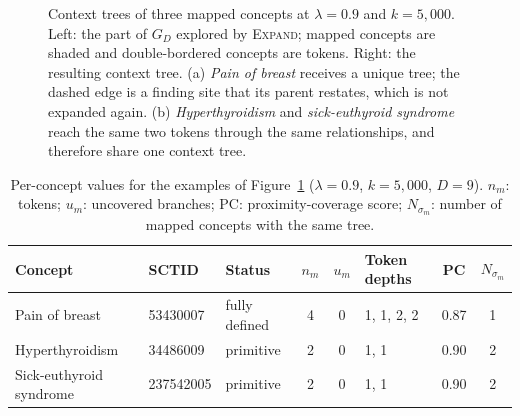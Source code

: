 \begin{figure}[t]
\caption{Context trees of three mapped concepts at $\lambda = 0.9$ and $k = 5{,}000$. Left: the part of $G_D$ explored by \textsc{Expand}; mapped concepts are shaded and double-bordered concepts are tokens. Right: the resulting context tree. (a) \textit{Pain of breast} receives a unique tree; the dashed edge is a finding site that its parent restates, which is not expanded again. (b) \textit{Hyperthyroidism} and \textit{sick-euthyroid syndrome} reach the same two tokens through the same relationships, and therefore share one context tree.}
\label{fig:example-trees}
\end{figure}

\begin{table}[t]
\centering
\small
\caption{Per-concept values for the examples of Figure~\ref{fig:example-trees} ($\lambda = 0.9$, $k = 5{,}000$, $D = 9$). $n_m$: tokens; $u_m$: uncovered branches; PC: proximity-coverage score; $N_{\sigma_m}$: number of mapped concepts with the same tree.}
\label{tab:example-trees}
\begin{tabular}{@{}lllcclcc@{}}
\toprule
Concept & SCTID & Status & $n_m$ & $u_m$ & Token depths & PC & $N_{\sigma_m}$ \\
\midrule
Pain of breast          & 53430007  & fully defined & 4 & 0 & 1, 1, 2, 2 & 0.87 & 1 \\
Hyperthyroidism         & 34486009  & primitive     & 2 & 0 & 1, 1       & 0.90 & 2 \\
Sick-euthyroid syndrome & 237542005 & primitive     & 2 & 0 & 1, 1       & 0.90 & 2 \\
\bottomrule
\end{tabular}
\end{table}

